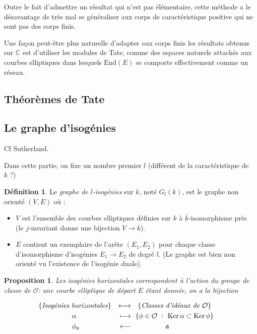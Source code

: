 \documentclass[11pt,a4paper]{article}
\newcommand{\C}{\mathbb{C}}
\renewcommand{\O}{\mathcal{O}}
\newcommand{\vers}{\rightarrow}
\newcommand{\End}{\mathrm{End}}
\renewcommand{\frak}{\mathfrak}
\newtheorem{prop}[thm]{Proposition}
\theoremstyle{definition}
\newtheorem{defi}[thm]{Définition}
\begin{document}
Outre le fait d'admettre un résultat qui n'est pas élémentaire, cette méthode a le désavantage de très mal se généraliser aux corps de caractéristique positive qui ne sont pas des corps finis.

Une façon peut-être plus naturelle d'adapter aux corps finis les résultats obtenus sur $\C$ est d'utiliser les modules de Tate, comme des espaces naturels attachés aux courbes elliptiques dans lesquels $\End(E)$ se comporte effectivement comme un réseau.




\newpage

\subsection{Théorèmes de Tate}




\newpage

\subsection{Le graphe d'isogénies}

Cf Sutherland.

Dans cette partie, on fixe un nombre premier $l$ (différent de la caractéristique de $k$ ?)

\begin{defi}
Le \emph{graphe de $l$-isogénies} sur $k$, noté $G_l(k)$, est le graphe non orienté $(V,E)$ où :
\begin{itemize}
\item $V$ est l'ensemble des courbes elliptiques définies sur $k$ à $\bar{k}$-isomorphisme près (le $j$-invariant donne une bijection $V\vers k$).
\item $E$ contient un exemplaire de l'arête $(E_1,E_2)$ pour chaque classe d'isomorphisme d'isogénies $E_1\vers E_2$ de degré $l$. (Le graphe est bien non orienté vu l'existence de l'isogénie duale).
\end{itemize}

\end{defi}



\begin{prop}

Les isogénies horizontales correspondent à l'action du groupe de classe de $\O$: une courbe elliptique de départ $E$ étant donnée, on a la bijection

$$\begin{aligned}
& \left\{\text{\emph{Isogénies horizontales}}\right\} & \longleftrightarrow &\quad \{\text{\emph{Classes d'idéaux de}}\ \O \} &\\
& \quad\qquad\qquad \alpha & \longmapsto &\ \ \{\phi\in\O\ :\ \mathrm{Ker}\,\alpha \subset\mathrm{Ker}\,\phi\} &\\
& \quad\qquad\qquad \phi_{\frak a} & \longleftarrow & \quad\qquad\qquad \frak a &
\end{aligned}$$

\end{prop}
\end{document}
